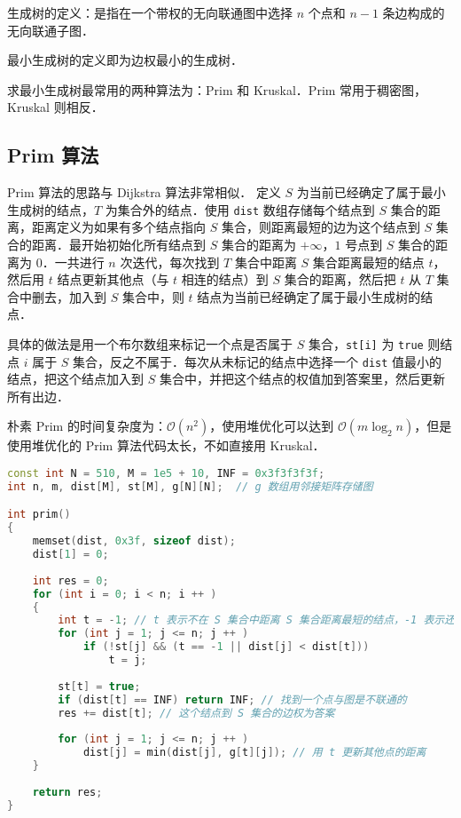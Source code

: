 
\begin{issues}
\issueMissDepend
\end{issues}


生成树的定义：是指在一个带权的无向联通图中选择 $n$ 个点和 $n - 1$ 条边构成的无向联通子图．

最小生成树的定义即为边权最小的生成树．

求最小生成树最常用的两种算法为：Prim 和 Kruskal．Prim 常用于稠密图，Kruskal 则相反．

\subsection{Prim 算法}

Prim 算法的思路与 Dijkstra 算法非常相似．
定义 $S$ 为当前已经确定了属于最小生成树的结点，$T$ 为集合外的结点．使用 \verb|dist| 数组存储每个结点到 $S$ 集合的距离，距离定义为如果有多个结点指向 $S$ 集合，则距离最短的边为这个结点到 $S$ 集合的距离．最开始初始化所有结点到 $S$ 集合的距离为 $+\infty$，$1$ 号点到 $S$ 集合的距离为 $0$．一共进行 $n$ 次迭代，每次找到 $T$ 集合中距离 $S$ 集合距离最短的结点 $t$，然后用 $t$ 结点更新其他点（与 $t$ 相连的结点）到 $S$ 集合的距离，然后把 $t$ 从 $T$ 集合中删去，加入到 $S$ 集合中，则 $t$ 结点为当前已经确定了属于最小生成树的结点．

具体的做法是用一个布尔数组来标记一个点是否属于 $S$ 集合，\verb|st[i]| 为 \verb|true| 则结点 $i$ 属于 $S$ 集合，反之不属于．每次从未标记的结点中选择一个 \verb|dist| 值最小的结点，把这个结点加入到 $S$ 集合中，并把这个结点的权值加到答案里，然后更新所有出边．

朴素 Prim 的时间复杂度为：$\mathcal{O}(n^2)$，使用堆优化可以达到 $\mathcal{O}(m \log_2 n)$，但是使用堆优化的 Prim 算法代码太长，不如直接用 Kruskal．

\begin{lstlisting}[language=cpp]
const int N = 510, M = 1e5 + 10, INF = 0x3f3f3f3f;
int n, m, dist[M], st[M], g[N][N];  // g 数组用邻接矩阵存储图

int prim()
{
    memset(dist, 0x3f, sizeof dist);
    dist[1] = 0;
    
    int res = 0;
    for (int i = 0; i < n; i ++ )
    {
        int t = -1; // t 表示不在 S 集合中距离 S 集合距离最短的结点，-1 表示还没找到
        for (int j = 1; j <= n; j ++ )
            if (!st[j] && (t == -1 || dist[j] < dist[t]))  
                t = j;  
        
        st[t] = true;
        if (dist[t] == INF) return INF; // 找到一个点与图是不联通的
        res += dist[t]; // 这个结点到 S 集合的边权为答案
        
        for (int j = 1; j <= n; j ++ )
            dist[j] = min(dist[j], g[t][j]); // 用 t 更新其他点的距离
    }
     
    return res;
}
\end{lstlisting}

